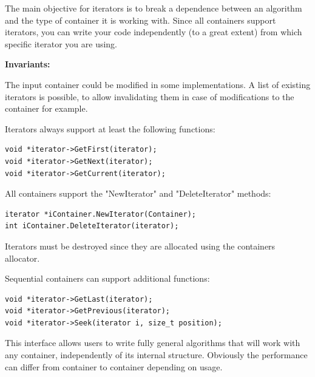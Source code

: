 \documentclass[12pt,a4paper,openany]{memoir} %
\newcommand{\Const}{
{\par\noindent \textbf{Invariants:}\noindent}
}
\begin{document}
The main objective for iterators is to break a dependence between an algorithm and the type of container it is working with. Since all containers
support iterators, you can write your code independently (to a great extent) from which specific iterator you are using.
\Const The input container could be modified in some implementations. A list of existing iterators is possible, to allow invalidating them in case of
modifications to the container for example.

Iterators always support at least the following functions:
\begin{verbatim}
void *iterator->GetFirst(iterator);
void *iterator->GetNext(iterator);
void *iterator->GetCurrent(iterator);
\end{verbatim}
All containers support the "NewIterator"  and "DeleteIterator" methods:
\begin{verbatim}
iterator *iContainer.NewIterator(Container); 
int iContainer.DeleteIterator(iterator);
\end{verbatim}
Iterators must be destroyed since they are allocated using the containers allocator.

Sequential containers can support additional functions:
\begin{verbatim}
void *iterator->GetLast(iterator);
void *iterator->GetPrevious(iterator);
void *iterator->Seek(iterator i, size_t position);
\end{verbatim}
This interface allows users to write fully general algorithms that will work with any container, independently of its internal structure. Obviously the 
performance can differ from container to container depending on usage.
\end{document}
